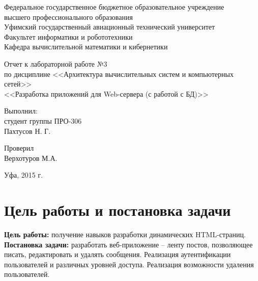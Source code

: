 \documentclass[a4paper]{article}
\begin{document}
\begin{titlepage}
  \begin{center}
    \large
    Федеральное государственное бюджетное образовательное учреждение\\
высшего профессионального образования\\
Уфимский государственный авиационный технический университет\\
Факультет информатики и робототехники\\
Кафедра вычислительной математики и кибернетики

	\vfill
    
    Отчет к лабораторной работе №3\\
    по дисциплине <<Архитектура вычислительных систем и компьютерных сетей>>\\[2mm]
    <<Разработка приложений для Web-сервера (с работой с БД)>>
  \bigskip

\end{center}
\vfill


\hfill\begin{minipage}{0.25\textwidth}
\flushright
	Выполнил:\\
	студент группы ПРО-306\\
	Пахтусов Н. Г.\\
\end{minipage}%
\bigskip

\hfill\begin{minipage}{0.2\textwidth}
\flushright
  Проверил\\
  Верхотуров М.А.
\end{minipage}%
\vfill

\begin{center}
  Уфа, 2015 г.
\end{center}
\end{titlepage}

\tableofcontents
\newpage

\section{Цель работы и постановка задачи}
\textbf{Цель работы:} получение навыков разработки динамических HTML-страниц.
\\

\textbf{Постановка задачи:} разработать веб-приложение -- ленту постов, позволяющее писать, редактировать и удалять сообщения. Реализация аутентификации пользователей и различных уровней доступа. Реализация возможности удаления пользователей.
\\
\end{document}
